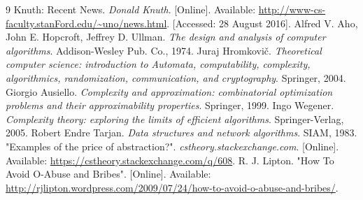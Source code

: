 \documentclass[12pt]{book} %
\begin{document}
\begin{thebibliography}{9}
Knuth: Recent News. \textit{Donald Knuth}. [Online]. Available: \url{http://www-cs-faculty.stanFord.edu/~uno/news.html}. [Accessed: 28 August 2016].
Alfred V. Aho, John E. Hopcroft, Jeffrey D. Ullman. \textit{The design and analysis of computer algorithms}. Addison-Wesley Pub. Co., 1974.
Juraj Hromkovič. \textit{Theoretical computer science: introduction to Automata, computability, complexity, algorithmics, randomization, communication, and cryptography}. Springer, 2004.
Giorgio Ausiello. \textit{Complexity and approximation: combinatorial optimization problems and their approximability properties}. Springer, 1999.
Ingo Wegener. \textit{Complexity theory: exploring the limits of efficient algorithms}. Springer-Verlag, 2005.
Robert Endre Tarjan. \textit{Data structures and network algorithms}. SIAM, 1983.
"Examples of the price of abstraction?". \textit{cstheory.stackexchange.com}. [Online]. Available: \url{https://cstheory.stackexchange.com/q/608}.
R. J. Lipton. "How To Avoid O-Abuse and Bribes". [Online]. Available: \url{http://rjlipton.wordpress.com/2009/07/24/how-to-avoid-o-abuse-and-bribes/}.
\end{thebibliography}
\end{document}

